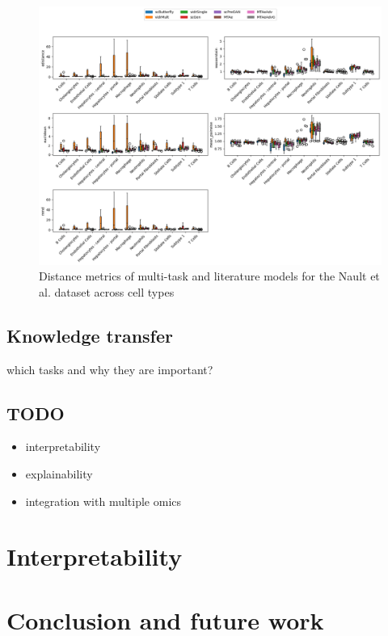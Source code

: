 \documentclass[12pt, a4paper]{article}
\begin{document}
\begin{figure}[h!]
    \centering
    \includegraphics[width=.85\textwidth]{selected_benchmarking_cell_type_distance_metrics_nault.png}
    \caption{Distance metrics of multi-task and literature models for the Nault et al. \cite{nault2021single,nault2022benchmarking} dataset across cell types}
    \label{fig:selected_nault_cell_type_distance}
\end{figure}



\clearpage


\subsection{Knowledge transfer}

which tasks and why they are important?

\subsection{TODO}

\begin{itemize}
    \item interpretability
    \item explainability
    \item integration with multiple omics
\end{itemize}

\section{Interpretability}


\section{Conclusion and future work}
\end{document}
